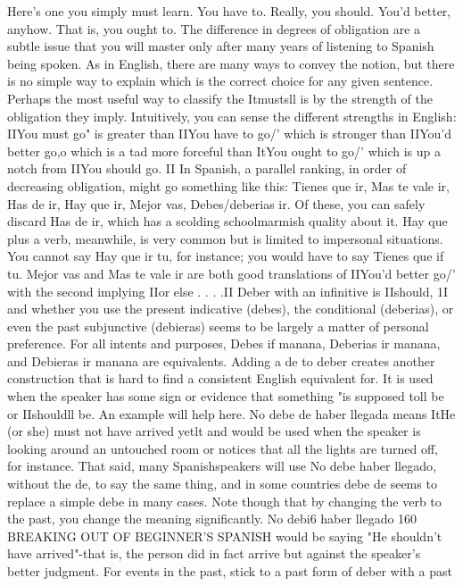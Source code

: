 {{{{%
Here's one you simply must learn. You have to. Really, you
should. You'd better, anyhow. That is, you ought to.
The difference in degrees of obligation are a subtle issue that
you will master only after many years of listening to Spanish being
spoken. As in English, there are many ways to convey the notion, but
there is no simple way to explain which is the correct choice for any
given sentence.
Perhaps the most useful way to classify the Itmustsll is by the
strength of the obligation they imply. Intuitively, you can sense the
different strengths in English: IIYou must go" is greater than IIYou have
to go/' which is stronger than IIYou'd better go,o which is a tad more
forceful than ItYou ought to go/' which is up a notch from IIYou should
go. II In Spanish, a parallel ranking, in order of decreasing obligation,
might go something like this: Tienes que ir, Mas te vale ir, Has de ir,
Hay que ir, Mejor vas, Debes/deberias ir. Of these, you can safely discard Has de ir, which has a scolding schoolmarmish quality about it.
Hay que plus a verb, meanwhile, is very common but is limited to impersonal situations. You cannot say Hay que ir tu, for instance; you
would have to say Tienes que if tu. Mejor vas and Mas te vale ir are
both good translations of IIYou'd better go/' with the second implying
IIor else . . . .II
Deber with an infinitive is IIshould, 1I and whether you use the
present indicative (debes), the conditional (deberias), or even the past
subjunctive (debieras) seems to be largely a matter of personal preference. For all intents and purposes, Debes if manana, Deberias ir manana, and Debieras ir manana are equivalents.
Adding a de to deber creates another construction that is
hard to find a consistent English equivalent for. It is used when the
speaker has some sign or evidence that something "is supposed toll
be or IIshouldll be. An example will help here. No debe de haber llegada means ItHe (or she) must not have arrived yetlt and would be used
when the speaker is looking around an untouched room or notices that
all the lights are turned off, for instance. That said, many Spanishspeakers will use No debe haber llegado, without the de, to say the
same thing, and in some countries debe de seems to replace a simple
debe in many cases. Note though that by changing the verb to the
past, you change the meaning significantly. No debi6 haber llegado
160 BREAKING OUT OF BEGINNER'S SPANISH
would be saying "He shouldn't have arrived"-that is, the person did
in fact arrive but against the speaker's better judgment.
For events in the past, stick to a past form of deber with a past
}}}}
